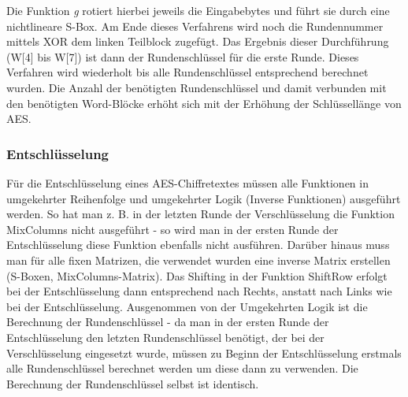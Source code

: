 \documentclass[10pt, a4paper]{scrreprt}
\begin{document}
Die Funktion \textit{g} rotiert hierbei jeweils die Eingabebytes und führt sie durch eine nichtlineare S-Box. Am Ende dieses Verfahrens wird noch die Rundennummer mittels XOR dem linken Teilblock zugefügt. Das Ergebnis dieser Durchführung (W[4] bis W[7]) ist dann der Rundenschlüssel für die erste Runde. Dieses Verfahren wird wiederholt bis alle Rundenschlüssel entsprechend berechnet wurden. Die Anzahl der benötigten Rundenschlüssel und damit verbunden mit den benötigten Word-Blöcke erhöht sich mit der Erhöhung der Schlüssellänge von AES.

\subsubsection{Entschlüsselung}
Für die Entschlüsselung eines AES-Chiffretextes müssen alle Funktionen in umgekehrter Reihenfolge und umgekehrter Logik (Inverse Funktionen) ausgeführt werden. So hat man z. B. in der letzten Runde der Verschlüsselung die Funktion MixColumns nicht ausgeführt - so wird man in der ersten Runde der Entschlüsselung diese Funktion ebenfalls nicht ausführen. Darüber hinaus muss man für alle fixen Matrizen, die verwendet wurden eine inverse Matrix erstellen (S-Boxen, MixColumns-Matrix). Das Shifting in der Funktion ShiftRow erfolgt bei der Entschlüsselung dann entsprechend nach Rechts, anstatt nach Links wie bei der Entschlüsselung. Ausgenommen von der Umgekehrten Logik ist die Berechnung der Rundenschlüssel - da man in der ersten Runde der Entschlüsselung den letzten Rundenschlüssel benötigt, der bei der Verschlüsselung eingesetzt wurde, müssen zu Beginn der Entschlüsselung erstmals alle Rundenschlüssel berechnet werden um diese dann zu verwenden. Die Berechnung der Rundenschlüssel selbst ist identisch.
\end{document}
